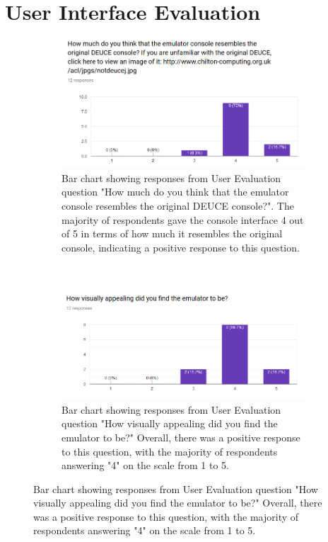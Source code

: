 \documentclass{l4proj}
\begin{document}
\section{User Interface Evaluation}

\begin{figure}[!h]
	\centering
	\begin{subfigure}[t]{0.45\textwidth}
		\includegraphics[width=\textwidth]{images/chart-1}
		\caption{Bar chart showing responses from User Evaluation question "How much do you think that the emulator console resembles the original DEUCE console?". The majority of respondents gave the console interface 4 out of 5 in terms of how much it resembles the original console, indicating a positive response to this question.}
		\label{fig:chart-1}
	\end{subfigure}
	~ %
	\begin{subfigure}[t]{0.45\textwidth}
		\includegraphics[width=\textwidth]{images/chart-2}
		\caption{Bar chart showing responses from User Evaluation question "How visually appealing did you find the emulator to be?" Overall, there was a positive response to this question, with the majority of respondents answering "4" on the scale from 1 to 5.}

\end{subfigure}
\end{figure}
\end{document}
